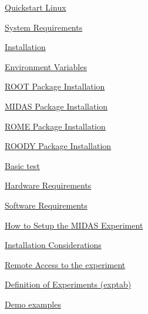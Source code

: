 \begin{TabularC}{2}
\begin{TabularC}{2}
\begin{DoxyItemize}
\item \hyperlink{Q_Linux}{Quickstart Linux} 
\begin{DoxyItemize}
\item \hyperlink{Q_Linux_Q_Linux_system_requirements}{System Requirements} 
\item \hyperlink{Q_Linux_Q_Linux_installation}{Installation} 
\begin{DoxyItemize}
\item \hyperlink{Q_Linux_Q_Linux_Environment_Variables}{Environment Variables} 
\item \hyperlink{Q_Linux_Q_Linux_Root_Installation}{ROOT Package Installation} 
\item \hyperlink{Q_Linux_Q_Linux_Midas_Installation}{MIDAS Package Installation} 
\item \hyperlink{Q_Linux_Q_Linux_Rome_Installation}{ROME Package Installation} 
\item \hyperlink{Q_Linux_Q_Linux_Roody_Installation}{ROODY Package Installation} 
\end{DoxyItemize}
\item \hyperlink{Q_Linux_Q_Linux_Basic_Test}{Basic test} 
\begin{DoxyItemize}
\item \hyperlink{Q_Linux_Q_Linux_Hardware_Requirements}{Hardware Requirements} 
\item \hyperlink{Q_Linux_Q_Linux_Software_Requirements}{Software Requirements} 
\item \hyperlink{Q_Linux_Q_Linux_Expt_Setup}{How to Setup the MIDAS Experiment} 
\end{DoxyItemize}
\item \hyperlink{Q_Linux_Q_Linux_Installation_Considerations}{Installation Considerations} 
\begin{DoxyItemize}
\item \hyperlink{Q_Linux_Q_Linux_Remote_Access}{Remote Access to the experiment} 
\item \hyperlink{Q_Linux_Q_Linux_Exptab}{Definition of Experiments (exptab)} 
\end{DoxyItemize}
\item \hyperlink{Q_Linux_Q_Linux_Demo_Examples}{Demo examples} 
\end{DoxyItemize}\par
 

\end{DoxyItemize}
\end{TabularC}
\end{TabularC}
